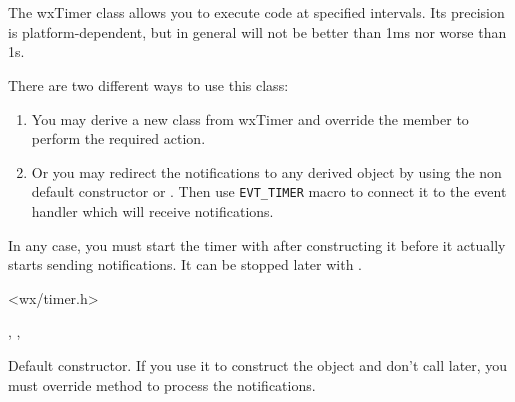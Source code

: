 \section{}\label{wxtimer}

The wxTimer class allows you to execute code at specified intervals. Its
precision is platform-dependent, but in general will not be better than 1ms nor
worse than 1s.

There are two different ways to use this class:

\begin{enumerate}
\item You may derive a new class from wxTimer and override the 
 member to perform the required action.
\item Or you may redirect the notifications to any 
 derived object by using the non default
constructor or . Then use {\tt EVT\_TIMER} 
macro to connect it to the event handler which will receive 
 notifications.
\end{enumerate}

In any case, you must start the timer with  
after constructing it before it actually starts sending notifications. It can
be stopped later with .




<wx/timer.h>


, , 




Default constructor. If you use it to construct the object and don't call 
 later, you must override 
 method to process the notifications.




